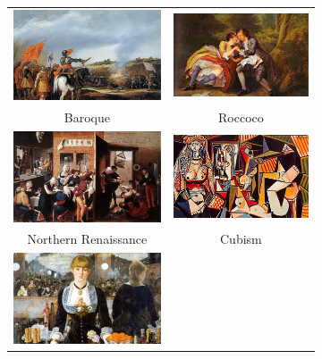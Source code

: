 \begin{figure}[t]
{\begin{subfigure}[t]{0.48\linewidth}
\begin{tabular}{cc}
        \includegraphics[width=.43\linewidth]{../style/figures/wikipaintingsDatasetExamples/used/resized/baroque-0.jpg} &
    \includegraphics[width=.43\linewidth]{../style/figures/wikipaintingsDatasetExamples/used/resized/roccoco-0.jpg} \\
    Baroque & Roccoco \\
        \includegraphics[width=.43\linewidth]{../style/figures/wikipaintingsDatasetExamples/used/resized/northern_renaissance-0.jpg} &
        \includegraphics[width=.43\linewidth]{../style/figures/wikipaintingsDatasetExamples/used/resized/cubism-0.jpg} \\
    Northern Renaissance & Cubism \\
        \includegraphics[width=.43\linewidth]{../style/figures/wikipaintingsDatasetExamples/used/resized/impressionism-0.jpg} &

\end{tabular}
\end{subfigure}}
\end{figure}
